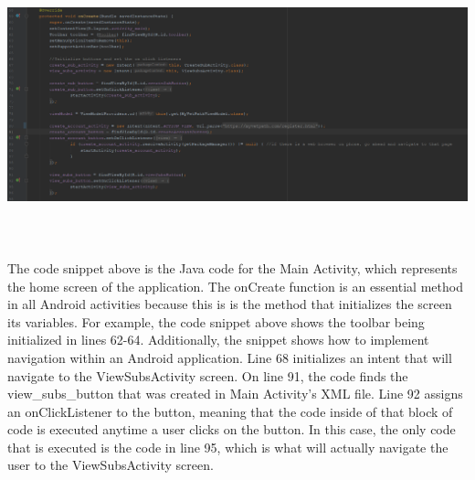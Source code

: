 \documentclass[onecolumn, draftclsnofoot,10pt, compsoc]{IEEEtran}
\begin{document}
 \begin{center}
\includegraphics[height=8cm]{main_oncreate.png}
\end{center}
The code snippet above is the Java code for the Main Activity, which represents the home screen of the application. The onCreate function is an essential method in all Android activities because this is is the method that initializes the screen its variables. For example, the code snippet above shows the toolbar being initialized in lines 62-64. Additionally, the snippet shows how to implement navigation within an Android application. Line 68 initializes an intent that will navigate to the ViewSubsActivity screen. On line 91, the code finds the view\_subs\_button that was created in Main Activity's XML file. Line 92 assigns an onClickListener to the button, meaning that the code inside of that block of code is executed anytime a user clicks on the button. In this case, the only code that is executed is the code in line 95, which is what will actually navigate the user to the ViewSubsActivity screen.
\end{document}
